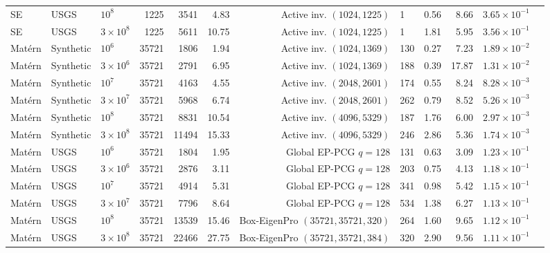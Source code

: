 \begin{table}[t]
{\begin{tabular}{lllrrrrlrrrr}
SE & USGS & \(10^8\) & 1225 & 3541 & 4.83 & Active inv. \((1024,1225)\) & 1 & 0.56 & 8.66 & \(3.65{\times}10^{-1}\) \\
SE & USGS & \(3{\times}10^8\) & 1225 & 5611 & 10.75 & Active inv. \((1024,1225)\) & 1 & 1.81 & 5.95 & \(3.56{\times}10^{-1}\) \\
\addlinespace[1pt]
Mat\'ern & Synthetic & \(10^6\) & 35721 & 1806 & 1.94 & Active inv. \((1024,1369)\) & 130 & 0.27 & 7.23 & \(1.89{\times}10^{-2}\) \\
Mat\'ern & Synthetic & \(3{\times}10^6\) & 35721 & 2791 & 6.95 & Active inv. \((1024,1369)\) & 188 & 0.39 & 17.87 & \(1.31{\times}10^{-2}\) \\
Mat\'ern & Synthetic & \(10^7\) & 35721 & 4163 & 4.55 & Active inv. \((2048,2601)\) & 174 & 0.55 & 8.24 & \(8.28{\times}10^{-3}\) \\
Mat\'ern & Synthetic & \(3{\times}10^7\) & 35721 & 5968 & 6.74 & Active inv. \((2048,2601)\) & 262 & 0.79 & 8.52 & \(5.26{\times}10^{-3}\) \\
Mat\'ern & Synthetic & \(10^8\) & 35721 & 8831 & 10.54 & Active inv. \((4096,5329)\) & 187 & 1.76 & 6.00 & \(2.97{\times}10^{-3}\) \\
Mat\'ern & Synthetic & \(3{\times}10^8\) & 35721 & 11494 & 15.33 & Active inv. \((4096,5329)\) & 246 & 2.86 & 5.36 & \(1.74{\times}10^{-3}\) \\
\addlinespace[1pt]
Mat\'ern & USGS & \(10^6\) & 35721 & 1804 & 1.95 & Global EP-PCG \(q=128\) & 131 & 0.63 & 3.09 & \(1.23{\times}10^{-1}\) \\
Mat\'ern & USGS & \(3{\times}10^6\) & 35721 & 2876 & 3.11 & Global EP-PCG \(q=128\) & 203 & 0.75 & 4.13 & \(1.18{\times}10^{-1}\) \\
Mat\'ern & USGS & \(10^7\) & 35721 & 4914 & 5.31 & Global EP-PCG \(q=128\) & 341 & 0.98 & 5.42 & \(1.15{\times}10^{-1}\) \\
Mat\'ern & USGS & \(3{\times}10^7\) & 35721 & 7796 & 8.64 & Global EP-PCG \(q=128\) & 534 & 1.38 & 6.27 & \(1.13{\times}10^{-1}\) \\
Mat\'ern & USGS & \(10^8\) & 35721 & 13539 & 15.46 & Box-EigenPro \((35721,35721,320)\) & 264 & 1.60 & 9.65 & \(1.12{\times}10^{-1}\) \\
Mat\'ern & USGS & \(3{\times}10^8\) & 35721 & 22466 & 27.75 & Box-EigenPro \((35721,35721,384)\) & 320 & 2.90 & 9.56 & \(1.11{\times}10^{-1}\) \\
\bottomrule
\end{tabular}
}
\end{table}

